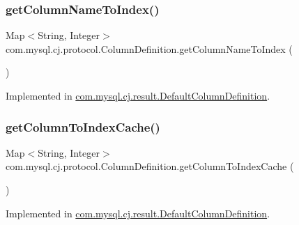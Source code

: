 \subsubsection{\texorpdfstring{get\+Column\+Name\+To\+Index()}{getColumnNameToIndex()}}
{\footnotesize\ttfamily Map$<$String, Integer$>$ com.\+mysql.\+cj.\+protocol.\+Column\+Definition.\+get\+Column\+Name\+To\+Index (\begin{DoxyParamCaption}{ }\end{DoxyParamCaption})}



Implemented in \mbox{\hyperlink{classcom_1_1mysql_1_1cj_1_1result_1_1_default_column_definition_a0062f342092aed8730976bb8d3cb1a83}{com.\+mysql.\+cj.\+result.\+Default\+Column\+Definition}}.

\mbox{\label{interfacecom_1_1mysql_1_1cj_1_1protocol_1_1_column_definition_a1317a18af8dde169cb972926f8e3521b}} 
\subsubsection{\texorpdfstring{get\+Column\+To\+Index\+Cache()}{getColumnToIndexCache()}}
{\footnotesize\ttfamily Map$<$String, Integer$>$ com.\+mysql.\+cj.\+protocol.\+Column\+Definition.\+get\+Column\+To\+Index\+Cache (\begin{DoxyParamCaption}{ }\end{DoxyParamCaption})}



Implemented in \mbox{\hyperlink{classcom_1_1mysql_1_1cj_1_1result_1_1_default_column_definition_a76daa3a615b1036aafa51dc1c02d2cba}{com.\+mysql.\+cj.\+result.\+Default\+Column\+Definition}}.

\mbox{\label{interfacecom_1_1mysql_1_1cj_1_1protocol_1_1_column_definition_ab5231022615e60179701e8e0b763c41a}} 
